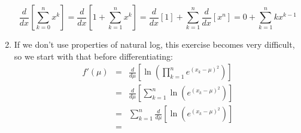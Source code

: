 \documentclass{article}
\begin{document}
\begin{enumerate}
            \[\frac{d}{dx}\left[\sum_{k=0}^nx^k\right] =\frac{d}{dx}\left[1+\sum_{k=1}^nx^k\right]=\frac{d}{dx}[1]+\sum_{k=1}^n\frac{d}{dx}\left[x^n\right]=0+\sum_{k=1}^n kx^{k-1} \]
       \item If we don't use properties of natural log, this exercise becomes very difficult, so we start with that before differentiating:
       \begin{eqnarray*}
        f'(\mu) &=& \frac{d}{d\mu}\left[\ln\left(\prod_{k=1}^{n}e^{(x_k-\mu)^2}\right)  \right] \\[1em]
        &=& \frac{d}{d\mu}\left[ \sum_{k=1}^n\ln\left(e^{(x_k-\mu)^2}\right)\right]\\[1em]
        &=&  \sum_{k=1}^n\frac{d}{d\mu}\left[\ln\left(e^{(x_k-\mu)^2}\right)\right]\\[1em]
        &=& 
       \end{eqnarray*}
    \end{enumerate}
\end{document}
